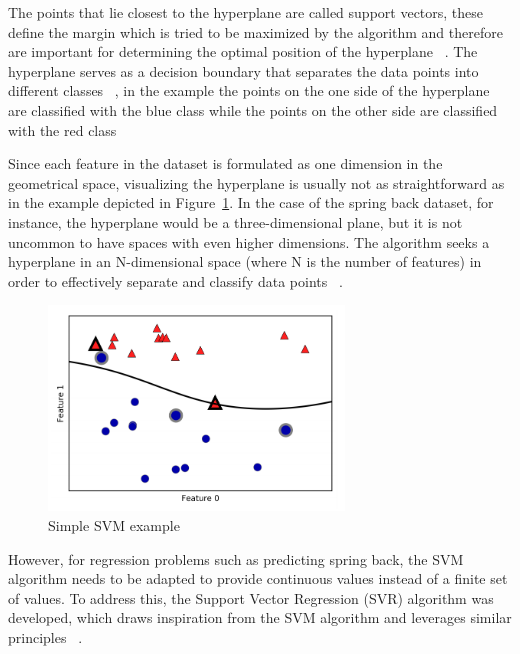 {The points that lie closest to the hyperplane are called support vectors, these define the margin which is tried to be
maximized by the algorithm and therefore are important for determining the optimal position of the hyperplane
~\cite[p. 42]{awad_efficientlearningmachines_2015}.
The hyperplane serves as a decision boundary that separates the data points into different
classes~\cite[p. 11]{awad_efficientlearningmachines_2015}
, in the example the points on the one side of the hyperplane are classified with the blue class while the
points on the other side are classified with the red class

Since each feature in the dataset is formulated as one dimension in the geometrical space, visualizing the hyperplane
is usually not as straightforward as in the example depicted in Figure~\ref{fig:svm-example}.
In the case of the spring back dataset, for instance, the hyperplane would be a three-dimensional plane, but it is
not uncommon to have spaces with even higher dimensions.
The algorithm seeks a hyperplane in an N-dimensional space (where N is the number of features) in order to
effectively separate and classify data points
~\cite[]{awad_efficientlearningmachines_2015}.

\begin{figure}[H]
    \begin{tcolorbox}[arc=0pt,boxrule=0.5pt]
        \centering
        \includegraphics[width=0.7\textwidth]{chap4/images/svm_example}
    \end{tcolorbox}
    \caption{Simple \ac{SVM} example~\cite[p. 94]{muller_introductionmachinelearning_2016}}
    \label{fig:svm-example}
\end{figure}

However, for regression problems such as predicting spring back, the \ac{SVM} algorithm
needs to be adapted to provide continuous values instead of a finite set of values.
To address this, the Support Vector Regression (SVR) algorithm was developed, which draws inspiration from the
\ac{SVM} algorithm and leverages similar principles
~\cite[p. 92]{muller_introductionmachinelearning_2016}.

}
